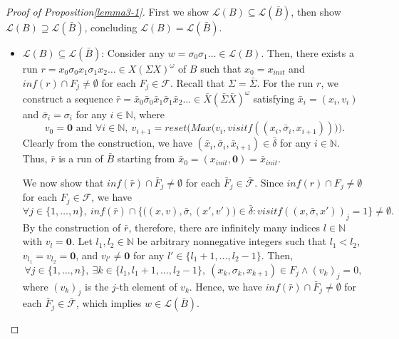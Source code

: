 \begin{proof}[Proof of Proposition\ref{lemma3-1}]
  First we show $ \mathcal{L}(B) \subseteq \mathcal{L}(\bar{B}) $, then show $ \mathcal{L}(B) \supseteq \mathcal{L}(\bar{B}) $, concluding $ \mathcal{L}(B) = \mathcal{L}(\bar{B}) $. \\
  \begin{itemize}
  	\item $ \mathcal{L}(B) \subseteq \mathcal{L}(\bar{B}) $:
  	Consider any $ w = \sigma_0 \sigma_1 \ldots \in \mathcal{L}(B) $.
  	Then, there exists a run $ r = x_0 \sigma_0 x_1 \sigma_1 x_2 \ldots \in X(\Sigma X)^\omega $ of $ B $ such that $ x_0 = x_{init} $ and $ inf(r) \cap F_j \neq \emptyset $ for each $ F_j \in \mathcal{F} $.
  	Recall that $ \Sigma = \bar{\Sigma} $.
  	For the run $ r $, we construct a sequence $ \bar{r} = \bar{x}_0 \bar{\sigma}_0 \bar{x}_1 \bar{\sigma}_1 \bar{x}_2 \ldots \in \bar{X}(\bar{\Sigma} \bar{X})^\omega $ satisfying $ \bar{x}_i = (x_i, {v}_i) $ and $ \bar{\sigma}_i = \sigma_i $ for any $ i \in \mathbb{N} $, where
  	\[
  	\ {v}_0 = \mathbf{0} \text{ and } \forall i \in \mathbb{N}, \ {v}_{i+1} = reset \Big( Max \big( {v}_i, visitf((x_i,\bar{\sigma}_i,x_{i+1})) \big) \Big).
  	\]
  	Clearly from the construction, we have $ (\bar{x}_i, \bar{\sigma}_i, \bar{x}_{i+1}) \in \bar{\delta} $ for any $ i \in \mathbb{N} $.
  	Thus, $ \bar{r} $ is a run of $ \bar{B} $ starting from $ \bar{x}_0 = (x_{init}, \mathbf{0}) = \bar{x}_{init} $.

  	We now show that $ inf(\bar{r}) \cap \bar{F}_j \neq \emptyset $ for each $ \bar{F}_j \in \bar{\mathcal{F}} $.
  	Since $ inf(r) \cap F_j \neq \emptyset $ for each $ F_j \in \mathcal{F} $, we have
  	\begin{equation*}
  	\forall j \in \{ 1, \ldots, n \}, \
  	inf(\bar{r}) \cap \{ \big((x, {v}), \bar{\sigma}, (x', {v}')\big) \in \bar{\delta}: visitf( (x, \bar{\sigma}, x'))_j = 1 \} \neq \emptyset.
  	\end{equation*}
  	By the construction of $ \bar{r} $, therefore, there are infinitely many indices $ l \in \mathbb{N} $ with $ v_l = \mathbf{0} $.
  	Let $ l_1, l_2 \in \mathbb{N} $ be arbitrary nonnegative integers such that $ l_1 < l_2 $, $ v_{l_1} = v_{l_2} = \mathbf{0} $, and $ v_{l'} \neq \mathbf{0} $ for any $ l' \in \{ l_1+1, \ldots, l_2-1\} $.
  	Then, %
  	\[
  	\forall j \in \{1, \ldots, n\}, \ \exists k \in \{  l_1, l_1+1, \ldots, l_2-1 \}, \
  	(x_k, \sigma_k, x_{k+1}) \in F_j \land (v_k)_j = 0 ,
  	\]
  	where $ (v_k)_j $ is the $ j $-th element of $ v_k $.
  	Hence, we have $ inf(\bar{r}) \cap \bar{F}_j \neq \emptyset $ for each $ \bar{F}_j \in \bar{\mathcal{F}} $, which implies $ w \in \mathcal{L}(\bar{B}) $.


\end{itemize}
\end{proof}
